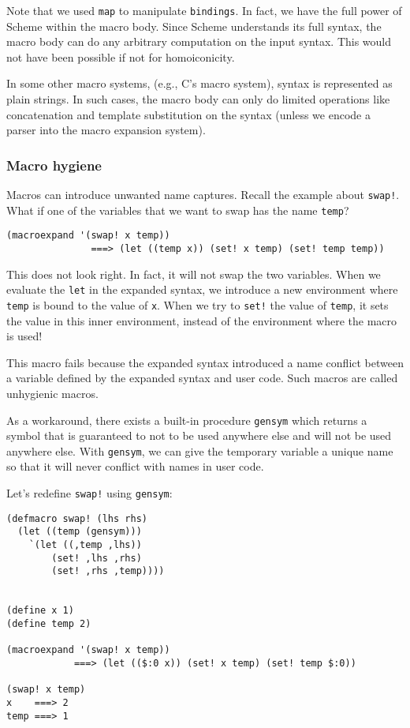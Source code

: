 \documentclass{article}
\begin{document}
Note that we used \texttt{map} to manipulate \texttt{bindings}. In fact, we have the full power of Scheme within the macro body. Since Scheme understands its full syntax, the macro body can do any arbitrary computation on the input syntax. This would not have been possible if not for homoiconicity.

In some other macro systems, (e.g., C's macro system), syntax is represented as plain strings. In such cases, the macro body can only do limited operations like concatenation and template substitution on the syntax (unless we encode a parser into the macro expansion system).

\subsubsection*{Macro hygiene}
Macros can introduce unwanted name captures. Recall the example about \texttt{swap!}. What if one of the variables that we want to swap has the name \texttt{temp}?

\begin{lstlisting}
(macroexpand '(swap! x temp))
               ===> (let ((temp x)) (set! x temp) (set! temp temp))
\end{lstlisting}

This does not look right. In fact, it will not swap the two variables. When we evaluate the \texttt{let} in the expanded syntax, we introduce a new environment where \texttt{temp} is bound to the value of \texttt{x}. When we try to \texttt{set!} the value of \texttt{temp}, it sets the value in this inner environment, instead of the environment where the macro is used!

This macro fails because the expanded syntax introduced a name conflict between a variable defined by the expanded syntax and user code. Such macros are called unhygienic macros.

As a workaround, there exists a built-in procedure \texttt{gensym} which returns a symbol that is guaranteed to not to be used anywhere else and will not be used anywhere else. With \texttt{gensym}, we can give the temporary variable a unique name so that it will never conflict with names in user code.

Let's redefine \texttt{swap!} using \texttt{gensym}:

\begin{lstlisting}
(defmacro swap! (lhs rhs)
  (let ((temp (gensym)))
    `(let ((,temp ,lhs))
        (set! ,lhs ,rhs)
        (set! ,rhs ,temp))))


(define x 1)
(define temp 2)

(macroexpand '(swap! x temp))
            ===> (let (($:0 x)) (set! x temp) (set! temp $:0))

(swap! x temp)
x    ===> 2
temp ===> 1
\end{lstlisting}
\end{document}
